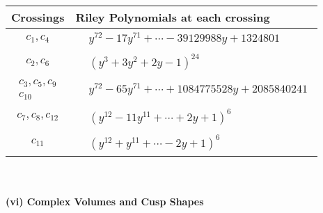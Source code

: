 \documentclass[1p]{elsarticle_modified}
\theoremstyle{definition}
\begin{document}
\begin{tabular}{m{50pt}|m{274pt}}
Crossings & \hspace{64pt}Riley Polynomials at each crossing \\
\hline $$\begin{aligned}c_{1},c_{4}\end{aligned}$$&$\begin{aligned}
&y^{72}-17 y^{71}+\cdots-39129988 y+1324801
\end{aligned}$\\
\hline $$\begin{aligned}c_{2},c_{6}\end{aligned}$$&$\begin{aligned}
&(y^3+3 y^2+2 y-1)^{24}
\end{aligned}$\\
\hline $$\begin{aligned}c_{3},c_{5},c_{9}\\c_{10}\end{aligned}$$&$\begin{aligned}
&y^{72}-65 y^{71}+\cdots+1084775528 y+2085840241
\end{aligned}$\\
\hline $$\begin{aligned}c_{7},c_{8},c_{12}\end{aligned}$$&$\begin{aligned}
&(y^{12}-11 y^{11}+\cdots+2 y+1)^{6}
\end{aligned}$\\
\hline $$\begin{aligned}c_{11}\end{aligned}$$&$\begin{aligned}
&(y^{12}+y^{11}+\cdots-2 y+1)^{6}
\end{aligned}$\\
\hline
\end{tabular}\\~\\
\newpage\flushleft \textbf{(vi) Complex Volumes and Cusp Shapes}
\end{document}
